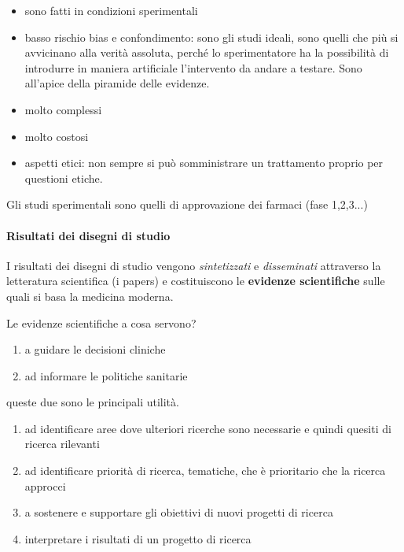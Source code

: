 \begin{itemize}
\item
  sono fatti in condizioni sperimentali
\item
  basso rischio bias e confondimento: sono gli studi ideali, sono quelli
  che più si avvicinano alla verità assoluta, perché lo sperimentatore
  ha la possibilità di introdurre in maniera artificiale l'intervento da
  andare a testare. Sono all'apice della piramide delle evidenze.
\item
  molto complessi
\item
  molto costosi
\item
  aspetti etici: non sempre si può somministrare un trattamento proprio
  per questioni etiche.
\end{itemize}

Gli studi sperimentali sono quelli di approvazione dei farmaci (fase
1,2,3...)

\paragraph{Risultati dei disegni di studio }


I risultati dei disegni di studio vengono \emph{sintetizzati} e
\emph{disseminati} attraverso la letteratura scientifica (i papers) e
costituiscono le \textbf{evidenze scientifiche} sulle quali si basa la
medicina moderna.

Le evidenze scientifiche a cosa servono?

\begin{enumerate}
\def\labelenumi{\arabic{enumi}.}
\item
  a guidare le decisioni cliniche
\item
  ad informare le politiche sanitarie
\end{enumerate}

queste due sono le principali utilità.

\begin{enumerate}
\def\labelenumi{\arabic{enumi}.}
\item
  ad identificare aree dove ulteriori ricerche sono necessarie e quindi
  quesiti di ricerca rilevanti
\item
  ad identificare priorità di ricerca, tematiche, che è prioritario che
  la ricerca approcci
\item
  a sostenere e supportare gli obiettivi di nuovi progetti di ricerca
\item
  interpretare i risultati di un progetto di ricerca
\end{enumerate}

